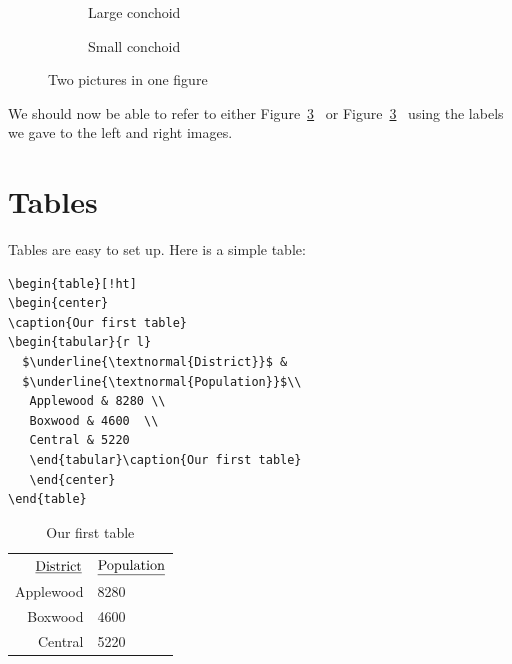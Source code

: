 \begin{figure}[!ht]
  \centering
    \begin{subfigure}[b]{0.4\textwidth} %
      \centering
      \caption[Large conchoid goes in the List]{Large conchoid}\label{fig3:left}
    \end{subfigure}
  \qquad
    \begin{subfigure}[b]{0.4\textwidth} %
      \centering
      \caption[Small conchoid goes in the List]{Small conchoid}\label{fig3:right}
    \end{subfigure}
  \caption{Two pictures in one figure}\label{fig3}
\end{figure}

We should now be able to refer to either Figure~\ref{fig3}~ or Figure~\ref{fig3}~ using the labels we gave to the left and right images.


\section{Tables}

Tables are easy to set up. Here is a simple table:
\begin{singlespace}\small
\begin{verbatim}
\begin{table}[!ht]
\begin{center}
\caption{Our first table}
\begin{tabular}{r l}
  $\underline{\textnormal{District}}$ &  
  $\underline{\textnormal{Population}}$\\
   Applewood & 8280 \\
   Boxwood & 4600  \\
   Central & 5220
   \end{tabular}\caption{Our first table}
   \end{center}
\end{table}
\end{verbatim}
\end{singlespace}
\begin{table}[!ht]
\begin{center}
\caption{Our first table}
\begin{tabular}{r l}
  $\underline{\textnormal{District}}$ &
    $\underline{\textnormal{Population}}$\\
   Applewood & 8280 \\
   Boxwood & 4600  \\
   Central & 5220
   \end{tabular}
   \end{center}
\end{table}

